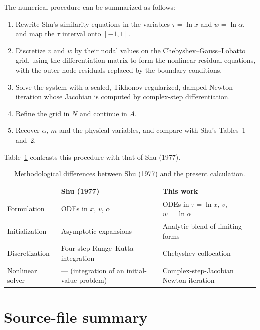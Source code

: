 \documentclass[11pt,a4paper]{article}
\begin{document}
The numerical procedure can be summarized as follows:

\begin{enumerate}
\item Rewrite Shu's similarity equations in the variables $\tau=\ln x$
      and $w=\ln\alpha$, and map the $\tau$ interval onto $[-1,1]$.
\item Discretize $v$ and $w$ by their nodal values on the
      Chebyshev--Gauss--Lobatto grid, using the differentiation matrix
      to form the nonlinear residual equations, with the outer-node
      residuals replaced by the boundary conditions.
\item Solve the system with a scaled, Tikhonov-regularized, damped Newton
      iteration whose Jacobian is computed by complex-step
      differentiation.
\item Refine the grid in $N$ and continue in $A$.
\item Recover $\alpha$, $m$ and the physical variables, and compare with
      Shu's Tables~1 and~2.
\end{enumerate}

Table~\ref{tab:methods} contrasts this procedure with that of Shu (1977).

\begin{table}[H]
\centering
\renewcommand{\arraystretch}{1.3}
\begin{tabular}{@{}p{3.4cm}p{5.2cm}p{5.6cm}@{}}
\toprule
 & \textbf{Shu (1977)} & \textbf{This work} \\
\midrule
Formulation & ODEs in $x$, $v$, $\alpha$ & ODEs in $\tau=\ln x$, $v$, $w=\ln\alpha$ \\
Initialization & Asymptotic expansions & Analytic blend of limiting forms \\
Discretization & Four-step Runge--Kutta integration & Chebyshev collocation \cite{trefethen2000} \\
Nonlinear solver & --- (integration of an initial-value problem) & Complex-step-Jacobian Newton iteration \cite{dennis1996,squire1998} \\
\bottomrule
\end{tabular}
\caption{Methodological differences between Shu (1977) and the present
calculation.}
\label{tab:methods}
\end{table}

\section{Source-file summary}
\end{document}
